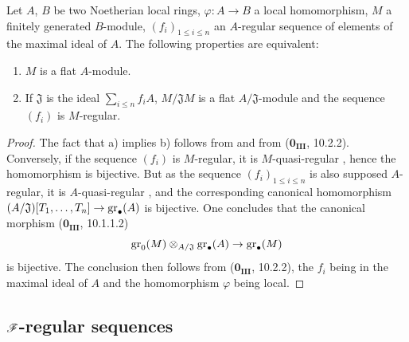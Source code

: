 \begin{proposition}[15.1.21]
\label{0.15.1.21}
Let $A$, $B$ be two Noetherian local rings, $\varphi:A\to B$ a local homomorphism, $M$ a finitely generated $B$-module, $(f_i)_{1\leq i\leq n}$ an $A$-regular sequence of elements of the maximal ideal of $A$.
The following properties are equivalent:
\begin{enumerate}
  \item[a)] $M$ is a flat $A$-module.
  \item[b)] If $\mathfrak{J}$ is the ideal $\sum_{i\leq n}f_iA$, $M/\mathfrak{J}M$ is a flat $A/\mathfrak{J}$-module and the sequence $(f_i)$ is $M$-regular.
\end{enumerate}
\end{proposition}

\begin{proof}
The fact that a) implies b) follows from  and from ($\mathbf{0_{III}}$, 10.2.2).
Conversely, if the sequence $(f_i)$ is $M$-regular, it is $M$-quasi-regular , hence the homomorphism  is bijective.
But as the sequence $(f_i)_{1\leq i\leq n}$ is also supposed $A$-regular, it is $A$-quasi-regular , and the corresponding canonical homomorphism $(A/\mathfrak{J})[T_1,\ldots,T_n]\to\operatorname{gr}_\bullet(A)$ is bijective.
One concludes that the canonical morphism ($\mathbf{0_{III}}$, 10.1.1.2)
\[
  \operatorname{gr}_0(M)\otimes_{A/\mathfrak{J}}\operatorname{gr}_\bullet(A) \to \operatorname{gr}_\bullet(M)
\]
is bijective.
The conclusion then follows from ($\mathbf{0_{III}}$, 10.2.2), the $f_i$ being in the maximal ideal of $A$ and the homomorphism $\varphi$ being local.
\end{proof}

\subsection{\texorpdfstring{$\mathscr{F}$}{F}-regular sequences}
\label{subsection:0.15.2}

